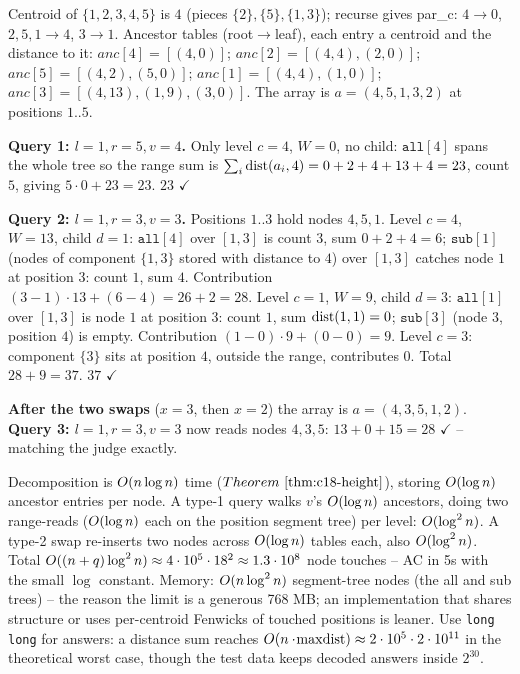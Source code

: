 \begin{tracebox}
Centroid of \(\{1,2,3,4,5\}\) is \(4\) (pieces \(\{2\},\{5\},\{1,3\}\)); recurse gives par\_c:
\(4\!\to\!0\), \(2,5,1\!\to\!4\), \(3\!\to\!1\). Ancestor tables (root\(\to\)leaf), each entry a
centroid and the distance to it: \(\mathit{anc}[4]=[(4,0)]\); \(\mathit{anc}[2]=[(4,4),(2,0)]\);
\(\mathit{anc}[5]=[(4,2),(5,0)]\); \(\mathit{anc}[1]=[(4,4),(1,0)]\);
\(\mathit{anc}[3]=[(4,13),(1,9),(3,0)]\). The array is \(a=(4,5,1,3,2)\) at positions \(1..5\).

\textbf{Query 1: \(l=1,r=5,v=4\).} Only level \(c=4\), \(W=0\), no child: \(\texttt{all}[4]\) spans
the whole tree so the range sum is \(\sum_i\operatorname{dist}(a_i,4)=0+2+4+13+4=23\), count \(5\), giving
\(5\cdot0+23=23\). \(\boxed{23}\) \(\checkmark\)

\textbf{Query 2: \(l=1,r=3,v=3\).} Positions \(1..3\) hold nodes \(4,5,1\).
Level \(c=4\), \(W=13\), child \(d=1\): \(\texttt{all}[4]\) over \([1,3]\) is count \(3\), sum
\(0+2+4=6\); \(\texttt{sub}[1]\) (nodes of component \(\{1,3\}\) stored with distance to \(4\)) over
\([1,3]\) catches node \(1\) at position \(3\): count \(1\), sum \(4\). Contribution
\((3-1)\cdot13+(6-4)=26+2=28\). Level \(c=1\), \(W=9\), child \(d=3\): \(\texttt{all}[1]\) over
\([1,3]\) is node \(1\) at position \(3\): count \(1\), sum \(\operatorname{dist}(1,1)=0\); \(\texttt{sub}[3]\)
(node \(3\), position \(4\)) is empty. Contribution \((1-0)\cdot9+(0-0)=9\). Level \(c=3\):
component \(\{3\}\) sits at position \(4\), outside the range, contributes \(0\). Total \(28+9=37\).
\(\boxed{37}\) \(\checkmark\)

\textbf{After the two swaps} (\(x=3\), then \(x=2\)) the array is \(a=(4,3,5,1,2)\). \textbf{Query 3:
\(l=1,r=3,v=3\)} now reads nodes \(4,3,5\): \(13+0+15=\boxed{28}\) \(\checkmark\) -- matching the
judge exactly.
\end{tracebox}

\begin{complexitybox}
Decomposition is \(O(n\log n)\) time (\(\thmref{c18-height}\)), storing \(O(\log n)\)
ancestor entries per node. A type-1 query walks \(v\)'s \(O(\log n)\) ancestors, doing two
range-reads (\(O(\log n)\) each on the position segment tree) per level: \(O(\log^2 n)\). A
type-2 swap re-inserts two nodes across \(O(\log n)\) tables each, also \(O(\log^2 n)\).
Total \(O((n+q)\log^2 n)\approx 4\cdot10^{5}\cdot 18^2 \approx 1.3\cdot10^{8}\) node touches --
AC in 5s with the small \(\log\) constant. Memory: \(O(n\log^2 n)\) segment-tree nodes (the
all and sub trees) -- the reason the limit is a generous 768 MB; an implementation that shares
structure or uses per-centroid Fenwicks of touched positions is leaner. Use \texttt{long long} for
answers: a distance sum reaches \(O(n\cdot\!\max\!\operatorname{dist})\approx 2\cdot10^{5}\cdot2\cdot10^{11}\) in
the theoretical worst case, though the test data keeps decoded answers inside \(2^{30}\).
\end{complexitybox}

